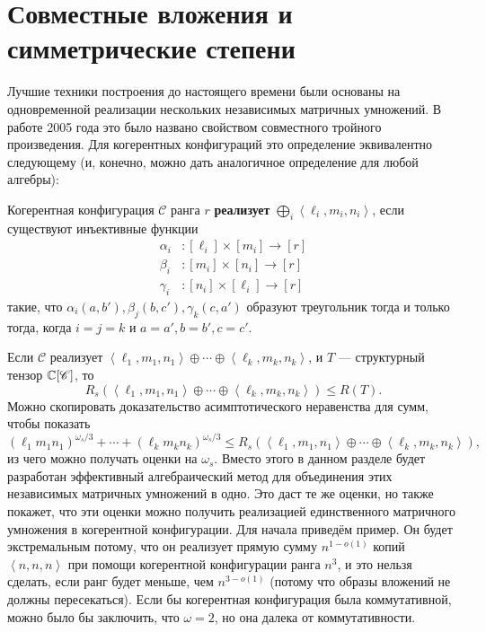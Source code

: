 \section{Совместные вложения и симметрические степени}

Лучшие техники построения до настоящего времени были основаны на одновременной реализации нескольких независимых матричных умножений. В работе 2005 года это было названо свойством совместного тройного произведения. Для когерентных конфигураций это определение эквивалентно следующему (и, конечно, можно дать аналогичное определение для любой алгебры):
\begin{definition}\label{def:12:5.1}
     Когерентная конфигурация $\mathscr{C}$ ранга $r$ \textbf{реализует} $\bigoplus_i \left\langle \ell_i, m_i, n_i  \right\rangle$, если существуют инъективные функции
     \begin{align*}
     	   \alpha_i &:[\ell_i] \times [m_i] \to [r]\\
     	   \beta_i &:[m_i] \times [n_i] \to [r]\\
     	   \gamma_i &:[n_i] \times [\ell_i] \to [r]
     \end{align*}
     такие, что $\alpha_i(a,b'), \beta_j(b,c'), \gamma_k(c,a')$ образуют треугольник тогда и только тогда, когда $i=j=k$ и $a=a',b=b',c=c'$.
\end{definition}

Если $\mathscr{C}$ реализует $\left\langle \ell_1,m_1,n_1 \right\rangle \oplus \dotsb \oplus \left\langle \ell_k,m_k,n_k \right\rangle$, и $T$ --- структурный тензор $\mathbb{C}[\mathscr{C}]$, то
\[
	R_s(\left\langle \ell_1,m_1,n_1 \right\rangle \oplus \dotsb \oplus \left\langle \ell_k,m_k,n_k \right\rangle) \leq R(T).
\]
Можно скопировать доказательство асимптотического неравенства для сумм, чтобы показать
\begin{equation}\label{eq:12:5.1}
	(\ell_1 m_1 n_1)^{\omega_s/3} + \dotsb + (\ell_k m_k n_k)^{\omega_s/3} \leq R_s(\left\langle \ell_1,m_1,n_1 \right\rangle \oplus \dotsb \oplus \left\langle \ell_k,m_k,n_k \right\rangle),
\end{equation}
из чего можно получать оценки на $\omega_s$. Вместо этого в данном разделе будет разработан эффективный алгебраический метод для объединения этих независимых матричных умножений в одно. Это даст те же оценки, но также покажет, что эти оценки можно получить реализацией единственного матричного умножения в когерентной конфигурации. Для начала приведём пример. Он будет экстремальным потому, что он реализует прямую сумму $n^{1-o(1)}$ копий $\left\langle n,n,n \right\rangle$ при помощи когерентной конфигурации ранга $n^3$, и это нельзя сделать, если ранг будет меньше, чем $n^{3-o(1)}$ (потому что образы вложений не должны пересекаться). Если бы когерентная конфигурация была коммутативной, можно было бы заключить, что $\omega=2$, но она далека от коммутативности.

